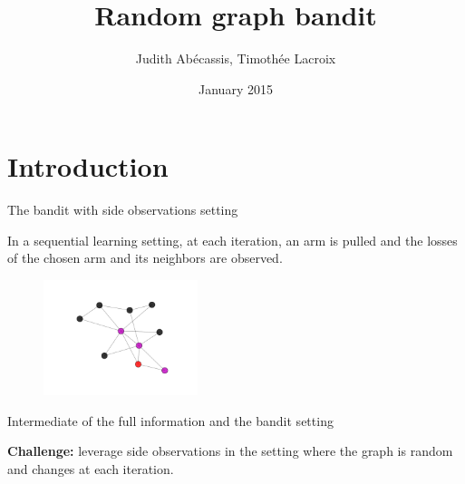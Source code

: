 \documentclass[11pt,xcolor={dvipsnames}]{beamer}
\author{Judith Abécassis, Timothée Lacroix}
\title{Random graph bandit}
\institute{Reinforcement learning}
\date{January 2015}
\begin{document}
\begin{frame}
\titlepage
\end{frame}
\section{Introduction}
\begin{frame}{The bandit with side observations setting}

In a sequential learning setting, at each iteration, an arm is pulled and the losses of
\textcolor{WildStrawberry}{the chosen arm and  its neighbors}
are observed.

	\begin{figure}[ht]
	\centering
	\includegraphics[width=0.4\textwidth]{labels_and_colors.pdf}	
	\end{figure}

Intermediate of the full information and the bandit setting
\vspace{0.7cm}

\textcolor{WildStrawberry}{\textbf{Challenge:}} leverage side observations in the setting where the graph is \textcolor{WildStrawberry}{random} and \textcolor{WildStrawberry}{changes at each iteration}.
\end{frame}
\end{document}
